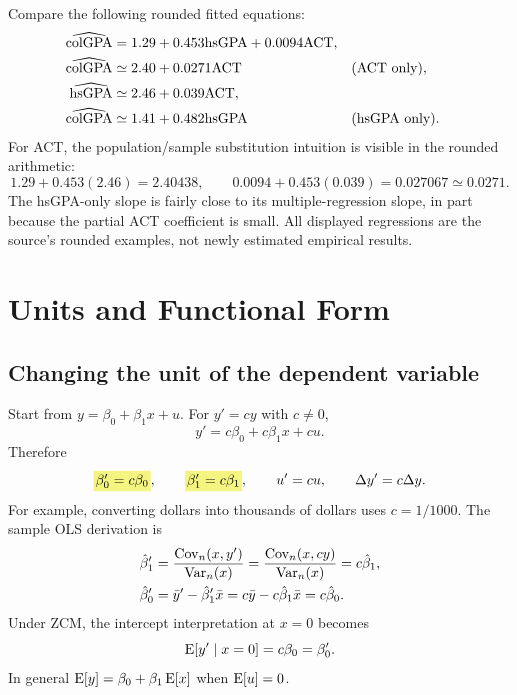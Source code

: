 \begin{example}\label{ex:gpa-short-long}
Compare the following rounded fitted equations:
\begin{align*}
\widehat{\mathrm{colGPA}}&=1.29+0.453\mathrm{hsGPA}+0.0094\mathrm{ACT},\\
\widehat{\mathrm{colGPA}}&\simeq2.40+0.0271\mathrm{ACT}
                       &&\text{(ACT only)},\\
\widehat{\mathrm{hsGPA}}&\simeq2.46+0.039\mathrm{ACT},\\
\widehat{\mathrm{colGPA}}&\simeq1.41+0.482\mathrm{hsGPA}
                       &&\text{(hsGPA only)}.
\end{align*}
For ACT, the population/sample substitution intuition is visible in the rounded arithmetic:
\[1.29+0.453(2.46)=2.40438,\qquad
0.0094+0.453(0.039)=0.027067\simeq0.0271.\]
The hsGPA-only slope is fairly close to its multiple-regression slope, in part because the partial ACT coefficient is small.  All displayed regressions are the source's rounded examples, not newly estimated empirical results.
\end{example}

\section{Units and Functional Form}
\label{sec:units}
\subsection{Changing the unit of the dependent variable}
Start from $y=\beta_0+\beta_1x+u$. For $y'=cy$ with $c\ne0$,
\[y'=c\beta_0+c\beta_1x+cu.\]
Therefore
\[\hy{$\beta'_0=c\beta_0$},\qquad
\hy{$\beta'_1=c\beta_1$},\qquad u'=cu,\qquad\Delta y'=c\Delta y.\]
For example, converting dollars into thousands of dollars uses $c=1/1000$.
The sample OLS derivation is
\begin{align*}
\hat\beta'_1
 &=\frac{\operatorname{Cov}_n(x,y')}{\operatorname{Var}_n(x)}
 =\frac{\operatorname{Cov}_n(x,cy)}{\operatorname{Var}_n(x)}
 =c\hat\beta_1,\\
\hat\beta'_0
 &=\bar y'-\hat\beta'_1\bar x
 =c\bar y-c\hat\beta_1\bar x=c\hat\beta_0.
\end{align*}
Under ZCM, the intercept interpretation at $x=0$ becomes
\[\operatorname{E}[y'\mid x=0]=c\beta_0=\beta'_0.\]
 In general $\operatorname{E}[y]=\beta_0+\beta_1\operatorname{E}[x]$ when $\operatorname{E}[u]=0$.

